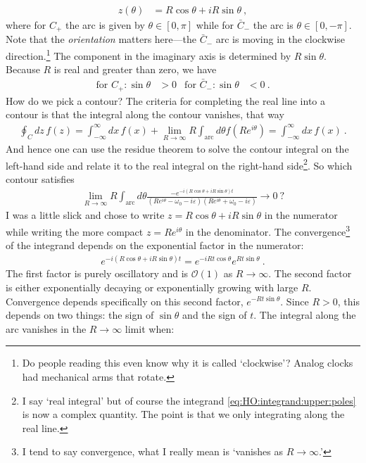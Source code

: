 \documentclass[
  11pt,
	colorful,
	raggedright,
]{tufte-style-thesis-flip}
\begin{document}
\begin{align}
  z(\theta) &= R\cos\theta + i R\sin\theta \ ,
\end{align}
where for $C_+$ the arc is given by $\theta \in [0,\pi]$ while for $\bar C_-$ the arc is $\theta\in[0,-\pi]$. Note that the \emph{orientation} matters here---the $\bar C_-$ arc is moving in the clockwise direction.\footnote{Do people reading this even know why it is called `clockwise'? Analog clocks had mechanical arms that rotate.} The component in the imaginary axis is determined by $R\sin\theta$. Because $R$ is real and greater than zero, we have
\begin{align}
  \text{for $C_+$:}\, \sin\theta &> 0
  &
  \text{for $\bar C_-$:}\, \sin\theta &<0 \ .
  \label{eq:HO:which:contour}
\end{align}
%
How do we pick a contour? The criteria for completing the real line into a contour is that the integral along the contour vanishes, that way
\begin{align}
  \oint_C dz\, f(z) 
  = \int_{-\infty}^\infty dx\, f(x) + \lim_{R\to \infty} R \int_\text{arc} d\theta f(Re^{i\theta}) 
  = \int_{-\infty}^\infty dx\, f(x) \ .
\end{align}
And hence one can use the residue theorem to solve the contour integral on the left-hand side and relate it to the real integral on the right-hand side\footnote{I say `real integral' but of course the integrand \eqref{eq:HO:integrand:upper:poles} is now a complex quantity. The point is that we  only integrating along the real line.}. 
%
So which contour satisfies
\begin{align}
  \lim_{R\to \infty} R \int_\text{arc} d\theta 
  \frac{-e^{-i(R\cos\theta + iR\sin\theta) t}}{(Re^{i\theta} - \omega_0 - i\varepsilon)(Re^{i\theta} + \omega_0 - i\varepsilon)}
  \to 0 \ ?
\end{align}
I was a little slick and chose to write $z = R\cos\theta + iR\sin\theta$ in the numerator while writing the more compact $z=Re^{i\theta}$ in the denominator. The convergence\footnote{I tend to say convergence, what I really mean is `vanishes as $R\to \infty$.'} of the integrand depends on the exponential factor in the numerator:
\begin{align}
  e^{-i(R\cos\theta + iR\sin\theta) t} = 
  e^{-iRt\cos\theta} e^{Rt\sin\theta} \ .
\end{align}
The first factor is purely oscillatory and is $\mathcal O(1)$ as $R\to\infty$. The second factor is either exponentially decaying or exponentially growing with large $R$. Convergence depends specifically on this second factor, $e^{-Rt\sin\theta}$. Since $R>0$, this depends on two things: the sign of $\sin\theta$ and the sign of $t$. The integral along the arc vanishes in the $R\to\infty$ limit when:
\end{document}
